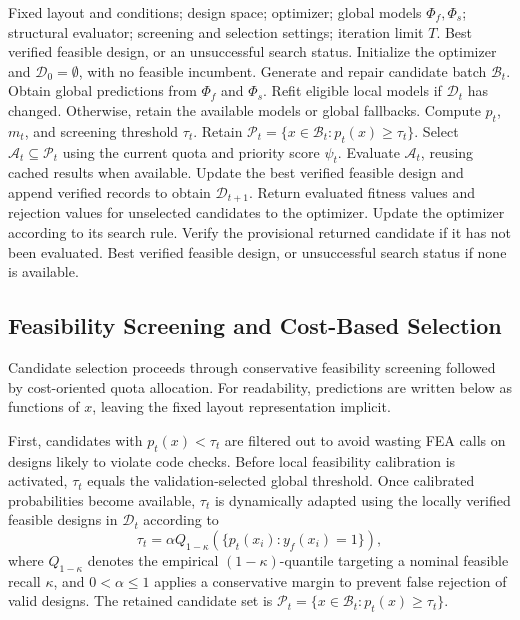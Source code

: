 \begin{algorithm}[htbp]
\caption{CASIO evaluation loop}
\label{alg:csa_optimization}
\begin{algorithmic}[1]
\REQUIRE Fixed layout and conditions; design space; optimizer; global models $\Phi_f,\Phi_s$; structural evaluator; screening and selection settings; iteration limit $T$.
\ENSURE Best verified feasible design, or an unsuccessful search status.
\STATE Initialize the optimizer and $\mathcal{D}_0=\emptyset$, with no feasible incumbent.
\STATE Generate and repair candidate batch $\mathcal{B}_t$.
\STATE Obtain global predictions from $\Phi_f$ and $\Phi_s$.
\STATE Refit eligible local models if $\mathcal{D}_t$ has changed. Otherwise, retain the available models or global fallbacks.
\STATE Compute $p_t$, $m_t$, and screening threshold $\tau_t$.
\STATE Retain $\mathcal{P}_t=\{x\in\mathcal{B}_t:p_t(x)\geq\tau_t\}$.
\STATE Select $\mathcal{A}_t\subseteq\mathcal{P}_t$ using the current quota and priority score $\psi_t$.
\STATE Evaluate $\mathcal{A}_t$, reusing cached results when available.
\STATE Update the best verified feasible design and append verified records to obtain $\mathcal{D}_{t+1}$.
\STATE Return evaluated fitness values and rejection values for unselected candidates to the optimizer.
\STATE Update the optimizer according to its search rule.
\ENDFOR
\STATE Verify the provisional returned candidate if it has not been evaluated.
\RETURN Best verified feasible design, or unsuccessful search status if none is available.
\end{algorithmic}
\end{algorithm}



\subsection{Feasibility Screening and Cost-Based Selection}
\label{subsec:candidate_screening_ranking}

Candidate selection proceeds through conservative feasibility screening followed by cost-oriented quota allocation. For readability, predictions are written below as functions of $x$, leaving the fixed layout representation implicit.

First, candidates with $p_t(x) < \tau_t$ are filtered out to avoid wasting FEA calls on designs likely to violate code checks. Before local feasibility calibration is activated, $\tau_t$ equals the validation-selected global threshold. Once calibrated probabilities become available, $\tau_t$ is dynamically adapted using the locally verified feasible designs in $\mathcal{D}_t$ according to
\begin{equation}
\tau_t=\alpha Q_{1-\kappa}\!\left(\{p_t(x_i):y_f(x_i)=1\}\right),
\label{eq:calibrated_threshold}
\end{equation}
where $Q_{1-\kappa}$ denotes the empirical $(1-\kappa)$-quantile targeting a nominal feasible recall $\kappa$, and $0<\alpha\leq 1$ applies a conservative margin to prevent false rejection of valid designs. The retained candidate set is $\mathcal{P}_t=\{x\in\mathcal{B}_t:p_t(x)\geq\tau_t\}$.

